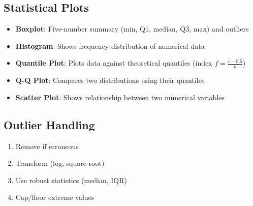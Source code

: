 \subsection*{Statistical Plots}
\begin{itemize}[noitemsep]
    \item \textbf{Boxplot}: Five-number summary (min, Q1, median, Q3, max) and outliers
    \item \textbf{Histogram}: Shows frequency distribution of numerical data
    \item \textbf{Quantile Plot}: Plots data against theoretical quantiles (index $f = \frac{i-0.5}{n}$)
    \item \textbf{Q-Q Plot}: Compares two distributions using their quantiles
    \item \textbf{Scatter Plot}: Shows relationship between two numerical variables
\end{itemize}

\subsection*{Outlier Handling}
\begin{enumerate}[noitemsep]
    \item Remove if erroneous
    \item Transform (log, square root)
    \item Use robust statistics (median, IQR)
    \item Cap/floor extreme values
\end{enumerate}
